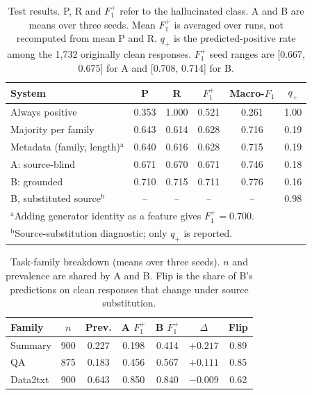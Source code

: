 \documentclass[conference]{IEEEtran}
\begin{document}
\begin{table}[t]
\caption{Test results. P, R and $F_1^{+}$ refer to the hallucinated class.
A and B are means over three seeds. Mean $F_1^{+}$ is averaged over runs, not
recomputed from mean P and R. $q_+$ is the predicted-positive rate among the 1{,}732 originally clean
responses. $F_1^{+}$ seed ranges are [0.667, 0.675] for A and [0.708, 0.714]
for B.}
\label{tab:systems}
\centering
\footnotesize
\setlength{\tabcolsep}{3pt}
\begin{tabular}{lccccc}
\hline
System & P & R & $F_1^{+}$ & Macro-$F_1$ & $q_+$ \\
\hline
Always positive            & 0.353 & 1.000 & 0.521 & 0.261 & 1.00 \\
Majority per family        & 0.643 & 0.614 & 0.628 & 0.716 & 0.19 \\
Metadata (family, length)$^{\mathrm{a}}$ & 0.640 & 0.616 & 0.628 & 0.715 & 0.19 \\
A: source-blind            & 0.671 & 0.670 & 0.671 & 0.746 & 0.18 \\
B: grounded                & 0.710 & 0.715 & 0.711 & 0.776 & 0.16 \\
B, substituted source$^{\mathrm{b}}$ & -- & -- & -- & -- & 0.98 \\
\hline
\multicolumn{6}{l}{$^{\mathrm{a}}$Adding generator identity as a feature gives $F_1^{+}=0.700$.}\\
\multicolumn{6}{l}{$^{\mathrm{b}}$Source-substitution diagnostic; only $q_+$ is reported.}
\end{tabular}
\end{table}

\begin{table}[t]
\caption{Task-family breakdown (means over three seeds). $n$ and prevalence
are shared by A and B. Flip is the share of B's predictions on clean responses
that change under source substitution.}
\label{tab:family}
\centering
\setlength{\tabcolsep}{4pt}
\begin{tabular}{lcccccc}
\hline
Family & $n$ & Prev. & A $F_1^{+}$ & B $F_1^{+}$ & $\Delta$ & Flip \\
\hline
Summary   & 900 & 0.227 & 0.198 & 0.414 & $+0.217$ & 0.89 \\
QA        & 875 & 0.183 & 0.456 & 0.567 & $+0.111$ & 0.85 \\
Data2txt  & 900 & 0.643 & 0.850 & 0.840 & $-0.009$ & 0.62 \\
\hline
\end{tabular}
\end{table}
\end{document}
